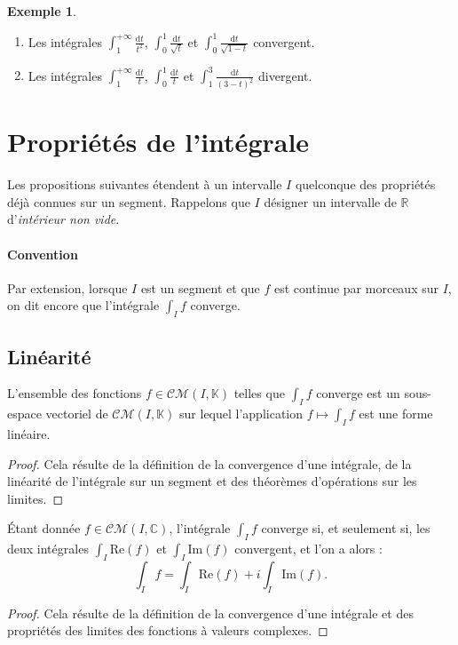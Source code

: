 \documentclass[french]{article}
\newcommand{\R}{\mathbb{R}}
\newcommand{\C}{\mathbb{C}}
\newcommand{\K}{\mathbb{K}}
\renewcommand{\d}{\text{d}}
\theoremstyle{plain}
\theoremstyle{definition}
\newtheorem*{ex}{Exemple}
\theoremstyle{remark}
\begin{document}
\begin{ex}
	\begin{enumerate}
		\item Les intégrales $\displaystyle\int_{1}^{+\infty}\frac{\d t}{t^2}$, $\displaystyle\int_{0}^{1}\frac{\d t}{\sqrt{t}}$ et $\displaystyle\int_{0}^{1}\frac{\d t}{\sqrt{1-t}}$ convergent.
		\item Les intégrales $\displaystyle\int_{1}^{+\infty}\frac{\d t}{t}$, $\displaystyle\int_{0}^{1}\frac{\d t}{t}$ et $\displaystyle\int_{1}^{3}\frac{\d t}{(3-t)^2}$ divergent.
	\end{enumerate}
\end{ex}

\section{Propriétés de l'intégrale}

Les propositions suivantes étendent à un intervalle $I$ quelconque des propriétés déjà connues sur un segment. Rappelons que $I$ désigner un intervalle de $\R$ d'\textit{intérieur non vide}.

\paragraph{Convention} Par extension, lorsque $I$ est un segment et que $f$ est continue par morceaux sur $I$, on dit encore que l'intégrale $\displaystyle\int_If$ converge.

\subsection{Linéarité}

\begin{prop}[Linéarité]%
	L'ensemble des fonctions $f\in\mathcal{CM}(I,\K)$ telles que $\displaystyle\int_I f$ converge est un sous-espace vectoriel de $\mathcal{CM}(I,\K)$ sur lequel l'application $f\mapsto\displaystyle\int_I f$ est une forme linéaire.
\end{prop}
\begin{proof}
	Cela résulte de la définition de la convergence d'une intégrale, de la linéarité de l'intégrale sur un segment et des théorèmes d'opérations sur les limites.
\end{proof}

\begin{prop}%
	Étant donnée $f\in\mathcal{CM}(I,\C)$, l'intégrale $\displaystyle\int_I f$ converge si, et seulement si, les deux intégrales $\displaystyle\int_I\text{Re}(f)$ et $\displaystyle\int_I\text{Im}(f)$ convergent, et l'on a alors : $$\int_{I}f=\int_I\text{Re}(f)+i\int_I\text{Im}(f).$$
\end{prop}
\begin{proof}
	Cela résulte de la définition de la convergence d'une intégrale et des propriétés des limites des fonctions à valeurs complexes.
\end{proof}
\end{document}
